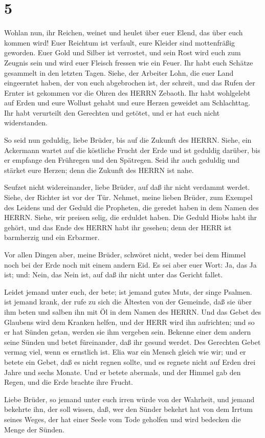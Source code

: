 \hypertarget{section-4}{%
\section{5}\label{section-4}}

 Wohlan nun, ihr Reichen, weinet und heulet über euer Elend,
das über euch kommen wird!  Euer Reichtum ist verfault, eure
Kleider sind mottenfräßig geworden.  Euer Gold und Silber
ist verrostet, und sein Rost wird euch zum Zeugnis sein und wird euer
Fleisch fressen wie ein Feuer. Ihr habt euch Schätze gesammelt in den
letzten Tagen.  Siehe, der Arbeiter Lohn, die euer Land
eingeerntet haben, der von euch abgebrochen ist, der schreit, und das
Rufen der Ernter ist gekommen vor die Ohren des HERRN Zebaoth.
 Ihr habt wohlgelebt auf Erden und eure Wollust gehabt und
eure Herzen geweidet am Schlachttag.  Ihr habt verurteilt
den Gerechten und getötet, und er hat euch nicht widerstanden.

 So seid nun geduldig, liebe Brüder, bis auf die Zukunft des
HERRN. Siehe, ein Ackermann wartet auf die köstliche Frucht der Erde und
ist geduldig darüber, bis er empfange den Frühregen und den Spätregen.
 Seid ihr auch geduldig und stärket eure Herzen; denn die
Zukunft des HERRN ist nahe.

 Seufzet nicht widereinander, liebe Brüder, auf daß ihr
nicht verdammt werdet. Siehe, der Richter ist vor der Tür. 
Nehmet, meine lieben Brüder, zum Exempel des Leidens und der Geduld die
Propheten, die geredet haben in dem Namen des HERRN. 
Siehe, wir preisen selig, die erduldet haben. Die Geduld Hiobs habt ihr
gehört, und das Ende des HERRN habt ihr gesehen; denn der HERR ist
barmherzig und ein Erbarmer.

 Vor allen Dingen aber, meine Brüder, schwöret nicht, weder
bei dem Himmel noch bei der Erde noch mit einem andern Eid. Es sei aber
euer Wort: Ja, das Ja ist; und: Nein, das Nein ist, auf daß ihr nicht
unter das Gericht fallet.

 Leidet jemand unter euch, der bete; ist jemand gutes Muts,
der singe Psalmen.  ist jemand krank, der rufe zu sich die
Ältesten von der Gemeinde, daß sie über ihm beten und salben ihn mit Öl
in dem Namen des HERRN.  Und das Gebet des Glaubens wird
dem Kranken helfen, und der HERR wird ihn aufrichten; und so er hat
Sünden getan, werden sie ihm vergeben sein.  Bekenne einer
dem andern seine Sünden und betet füreinander, daß ihr gesund werdet.
Des Gerechten Gebet vermag viel, wenn es ernstlich ist. 
Elia war ein Mensch gleich wie wir; und er betete ein Gebet, daß es
nicht regnen sollte, und es regnete nicht auf Erden drei Jahre und sechs
Monate.  Und er betete abermals, und der Himmel gab den
Regen, und die Erde brachte ihre Frucht.

 Liebe Brüder, so jemand unter euch irren würde von der
Wahrheit, und jemand bekehrte ihn,  der soll wissen, daß,
wer den Sünder bekehrt hat von dem Irrtum seines Weges, der hat einer
Seele vom Tode geholfen und wird bedecken die Menge der Sünden.
